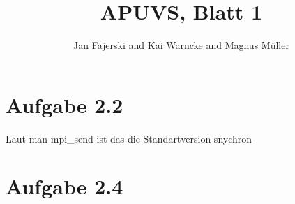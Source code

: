 \documentclass[a4paper,
               12pt,
               BCOR12mm,
               ]{scrartcl}
\title{APUVS, Blatt 1}
\author{Jan Fajerski and Kai Warncke and Magnus Müller}
\begin{document}
\maketitle  
  \section*{Aufgabe 2.2}
    Laut man mpi\_send ist das die Standartversion snychron

  \section*{Aufgabe 2.4}
    

		\nocite{*}
		
		
\end{document}
